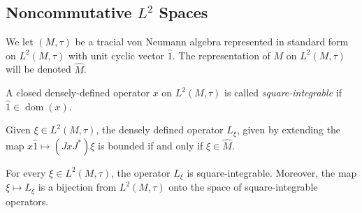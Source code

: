 \documentclass[10pt]{mypackage}
\begin{document}
\subsection{Noncommutative $L^2$ Spaces}%
We let $\left( M,\tau \right)$ be a tracial von Neumann algebra represented in standard form on $L^2\left( M,\tau \right)$ with unit cyclic vector $\hat{1}$. The representation of $M$ on $L^2\left( M,\tau \right)$ will be denoted $ \widehat{M} $.
\begin{definition}
  A closed densely-defined operator $x$ on $L^2\left( M,\tau \right)$ is called \textit{square-integrable} if $\hat{1}\in \operatorname{dom}\left( x \right)$.
\end{definition}
Given $\xi\in L^2\left( M,\tau \right)$, the densely defined operator $L_{\xi}$, given by extending the map $x\hat{1}\mapsto \left( JxJ^{\ast} \right)\xi$ is bounded if and only if $\xi\in\widehat{M}$.
\begin{theorem}
  For every $\xi\in L^2\left( M,\tau \right)$, the operator $L_{\xi}$ is square-integrable. Moreover, the map $\xi\mapsto L_{\xi}$ is a bijection from $L^2\left( M,\tau \right)$ onto the space of square-integrable operators.
\end{theorem}
\end{document}
